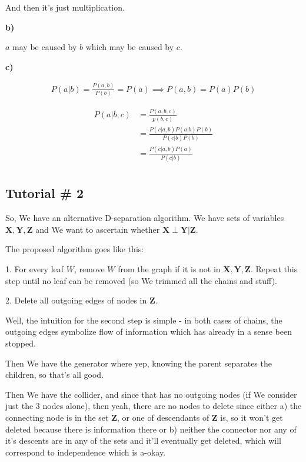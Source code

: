 \documentclass{article}
\begin{document}
				And then it's just multiplication.
			
			\textbf{b)}
			
				$a$ may be caused by $b$ which may be caused by $c$.
				
			\textbf{c)}
			
				\begin{align}
					P(a|b) = \frac{P(a, b)}{P(b)} = P(a)\implies P(a, b) = P(a)P(b)
				\end{align}
		
				\begin{align}
					P(a|b, c) &= \frac{P(a, b, c)}{p(b, c)}\\
					&= \frac{P(c|a, b)P(a|b)P(b)}{P(c|b)P(b)}\\
					&= \frac{P(c|a, b)P(a)}{P(c|b)}\\
				\end{align}
				
	\subsection*{Tutorial \# 2}
	
		So, We have an alternative D-separation algorithm. We have sets of variables $\mathbf{X, Y, Z}$ and We want to ascertain whether $\mathbf{X \perp Y | Z}$.
		
		The proposed algorithm goes like this:
		
		1. For every leaf $W$, remove $W$ from the graph if it is not in $\mathbf{X, Y, Z}$. Repeat this step until no leaf can be removed (so We trimmed all the chains and stuff).
		
		2. Delete all outgoing edges of nodes in $\mathbf{Z}$.
		
		Well, the intuition for the second step is simple - in both cases of chains, the outgoing edges symbolize flow of information which has already in a sense been stopped. 
		
		Then We have the generator where yep, knowing the parent separates the children, so that's all good.
		
		Then We have the collider, and since that has no outgoing nodes (if We consider just the 3 nodes alone), then yeah, there are no nodes to delete since either a) the connecting node is in the set $\mathbf{Z}$, or one of descendants of $\mathbf{Z}$ is, so it won't get deleted because there is information there or b) neither the connector nor any of it's descents are in any of the sets and it'll eventually get deleted, which will correspond to independence which is a-okay.
		
\end{document}
